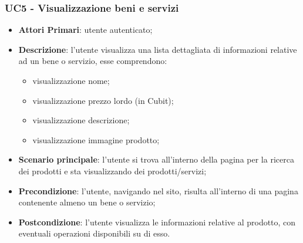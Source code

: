  \subsubsection{UC5 - Visualizzazione beni e servizi}
 \begin{itemize}
 	\item \textbf{Attori Primari}: utente autenticato;
 	\item \textbf{Descrizione}: l'utente visualizza una lista dettagliata di informazioni relative ad un bene o servizio, esse comprendono:
 	\begin{itemize}
 		\item visualizzazione nome;
 		\item visualizzazione prezzo lordo (in Cubit\glo);
 		\item visualizzazione descrizione;
 		\item visualizzazione immagine prodotto;
 	\end{itemize}
 	\item \textbf{Scenario principale}: l'utente si trova all'interno della pagina per la ricerca dei prodotti e sta visualizzando dei prodotti/servizi;
 	
 	\item \textbf{Precondizione}: l'utente, navigando nel sito, risulta all'interno di una pagina contenente almeno un bene o servizio;
 	\item \textbf{Postcondizione}: l'utente visualizza le informazioni relative al prodotto, con eventuali operazioni disponibili su di esso.
 \end{itemize}
 